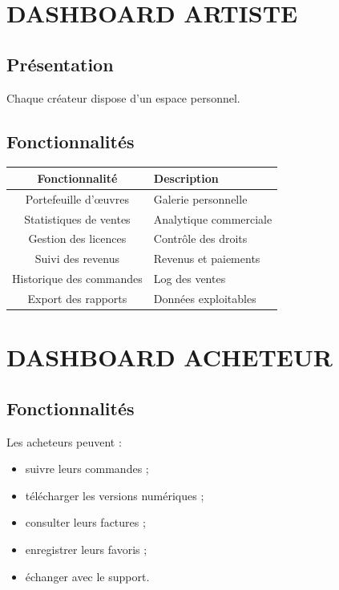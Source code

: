 \documentclass[12pt,a4paper,oneside]{book}
\begin{document}
\chapter{DASHBOARD ARTISTE}

\section{Présentation}
Chaque créateur dispose d'un espace personnel.

\section{Fonctionnalités}
\begin{center}
\begin{tabular}{|c|p{10cm}|}
\hline
\rowcolor{electronpurple}
\color{white}\textbf{Fonctionnalité} & \color{white}\textbf{Description} \\
\hline
Portefeuille d'œuvres & Galerie personnelle \\
\hline
Statistiques de ventes & Analytique commerciale \\
\hline
Gestion des licences & Contrôle des droits \\
\hline
Suivi des revenus & Revenus et paiements \\
\hline
Historique des commandes & Log des ventes \\
\hline
Export des rapports & Données exploitables \\
\hline
\end{tabular}
\end{center}

\chapter{DASHBOARD ACHETEUR}

\section{Fonctionnalités}
Les acheteurs peuvent :
\begin{itemize}
\item suivre leurs commandes ;
\item télécharger les versions numériques ;
\item consulter leurs factures ;
\item enregistrer leurs favoris ;
\item échanger avec le support.
\end{itemize}
\end{document}
